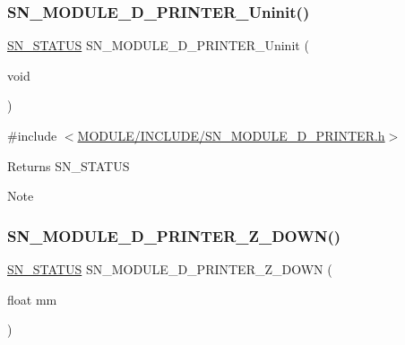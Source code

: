 \subsubsection{\texorpdfstring{S\+N\+\_\+\+M\+O\+D\+U\+L\+E\+\_\+D\+\_\+\+P\+R\+I\+N\+T\+E\+R\+\_\+\+Uninit()}{SN\_MODULE\_3D\_PRINTER\_Uninit()}}
{\footnotesize\ttfamily \hyperlink{group__SYSTEM__ERROR_ga4540713b9a7a18ce44d78c3a10f7442f}{S\+N\+\_\+\+S\+T\+A\+T\+US} S\+N\+\_\+\+M\+O\+D\+U\+L\+E\+\_\+D\+\_\+\+P\+R\+I\+N\+T\+E\+R\+\_\+\+Uninit (\begin{DoxyParamCaption}\item[{void}]{ }\end{DoxyParamCaption})}



{\ttfamily \#include $<$\hyperlink{SN__MODULE__3D__PRINTER_8h}{M\+O\+D\+U\+L\+E/\+I\+N\+C\+L\+U\+D\+E/\+S\+N\+\_\+\+M\+O\+D\+U\+L\+E\+\_\+D\+\_\+\+P\+R\+I\+N\+T\+E\+R.\+h}$>$}

\begin{DoxyReturn}{Returns}
S\+N\+\_\+\+S\+T\+A\+T\+US
\end{DoxyReturn}
\begin{DoxyNote}{Note}

\end{DoxyNote}
\mbox{\label{group__MODULE__3D__PRINTER_ga5747a0d753cb9d79747db6f4a22b18e9}} 
\subsubsection{\texorpdfstring{S\+N\+\_\+\+M\+O\+D\+U\+L\+E\+\_\+D\+\_\+\+P\+R\+I\+N\+T\+E\+R\+\_\+\+Z\+\_\+\+D\+O\+W\+N()}{SN\_MODULE\_3D\_PRINTER\_Z\_DOWN()}}
{\footnotesize\ttfamily \hyperlink{group__SYSTEM__ERROR_ga4540713b9a7a18ce44d78c3a10f7442f}{S\+N\+\_\+\+S\+T\+A\+T\+US} S\+N\+\_\+\+M\+O\+D\+U\+L\+E\+\_\+D\+\_\+\+P\+R\+I\+N\+T\+E\+R\+\_\+\+Z\+\_\+\+D\+O\+WN (\begin{DoxyParamCaption}\item[{float}]{mm }\end{DoxyParamCaption})}



